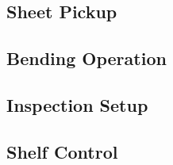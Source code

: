 \subsection{Sheet Pickup}
\label{subsec:sheet-pickup}

\FloatBarrier  %

\subsection{Bending Operation}
\label{subsec:bending-operation}

\FloatBarrier  %

\subsection{Inspection Setup}
\label{subsec:inspection}

\FloatBarrier  %

\subsection{Shelf Control}
\label{subsec:shelf-control}

\FloatBarrier  %
